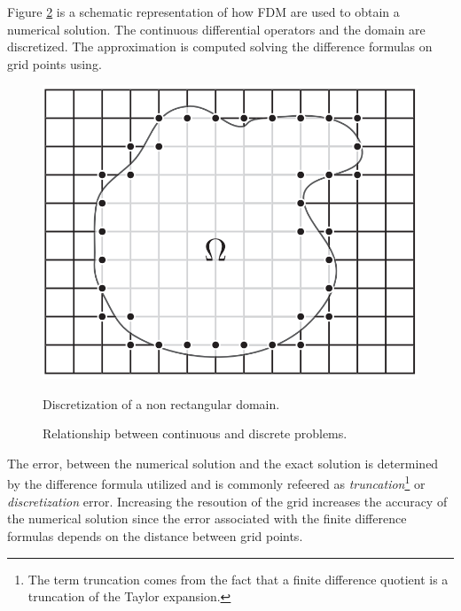 Figure \ref{fig:schematic_repr_fdm} is a schematic representation of how FDM are used to obtain a numerical solution. The continuous differential operators and the domain are discretized. The approximation is computed solving the difference formulas on grid points using.
\begin{figure}
\centering
\includegraphics[scale=0.3]{./images/CA_FDM/grid_custom_shape}
\label{fig:grid_custom_shape}
\caption{Discretization of a non rectangular domain.}
\end{figure}    
    
   

\begin{figure}[b]
    \centering
    \caption{Relationship between continuous and discrete problems.}
    \label{fig:schematic_repr_fdm}
\end{figure}
    
    The error, between the numerical solution and the exact solution is determined by the difference formula utilized and is commonly refeered as \textit{truncation}\footnote{The term truncation comes from the fact that a finite difference quotient is a truncation of the Taylor expansion.} or \textit{discretization} error.  Increasing the resoution of the grid increases the accuracy of the numerical solution since the error associated with the finite difference formulas depends on the distance between grid points.
    
